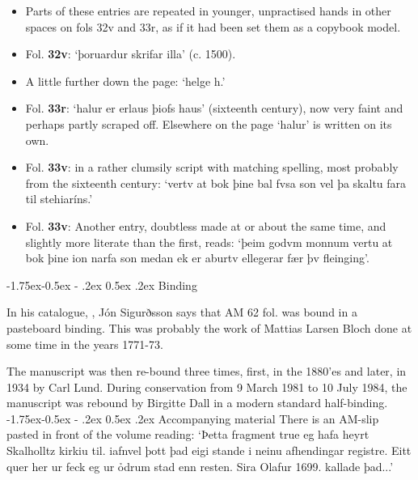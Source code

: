 \documentclass[11pt,twoside]{article}\makeatletter
\makeatletter
\renewcommand\subsection{\@startsection{subsection}{2}{\z@}%
     {-1.75ex\@plus -0.5ex \@minus- .2ex}%
     {0.5ex \@plus .2ex}%
     {\reset@font\Large\sffamily}}
\makeatother
\begin{document}
\begin{itemize}
\item Parts of these entries are repeated in younger, unpractised hands in other spaces on fols 32v and 33r, as if it had been set them as a copybook model.
\item Fol. \textbf{32v}:  ‘þoruardur skrifar illa’ (c. 1500).
\item A little further down the page: ‘helge h.’
\item Fol. \textbf{33r}:  ‘halur er erlaus þiofs haus’ (sixteenth century), now very faint and perhaps partly scraped off. Elsewhere on the page ‘halur’ is written on its own.
\item Fol. \textbf{33v}:  in a rather clumsily script with matching spelling, most probably from the sixteenth century: ‘vertv at bok þine {\hskip1pt}\newline  bal fvsa son vel þa skaltu {\hskip1pt}\newline  fara til stehiaríns.’
\item Fol. \textbf{33v}:  Another entry, doubtless made at or about the same time, and slightly more literate than the first, reads: ‘þeim godvm monnum vertu at bok þine ion narfa son medan ek {\hskip1pt}\newline  er aburtv ellegerar fær þv fleinging’.
\end{itemize} 
\subsection{Binding}
\par
In his catalogue, , Jón Sigurðsson says that AM 62 fol. was bound in a pasteboard binding. This was probably the work of Mattias Larsen Bloch done at some time in the years 1771-73.\par
The manuscript was then re-bound three times, first, in the 1880'es and later, in 1934 by Carl Lund. During conservation from 9 March 1981 to 10 July 1984, the manuscript was rebound by Birgitte Dall in a modern standard half-binding.
\subsection{Accompanying material}
There is an AM-slip pasted in front of the volume reading: ‘Þetta fragment true eg hafa {\hskip1pt}\newline  heyrt Skalholltz kirkiu til. {\hskip1pt}\newline  iafnvel þott þad eigi stande {\hskip1pt}\newline  i neinu afhendingar registre. {\hskip1pt}\newline  Eitt quer her ur feck eg ur ỏd{\hskip1pt}\newline rum stad enn resten. {\hskip1pt}\newline  Sira Olafur 1699. kallade þad...’
\end{document}
